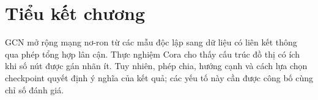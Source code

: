 \section{Tiểu kết chương}
GCN mở rộng mạng nơ-ron từ các mẫu độc lập sang dữ liệu có liên kết thông qua phép tổng hợp lân cận. Thực nghiệm Cora cho thấy cấu trúc đồ thị có ích khi số nút được gán nhãn ít. Tuy nhiên, phép chia, hướng cạnh và cách lựa chọn checkpoint quyết định ý nghĩa của kết quả; các yếu tố này cần được công bố cùng chỉ số đánh giá.
